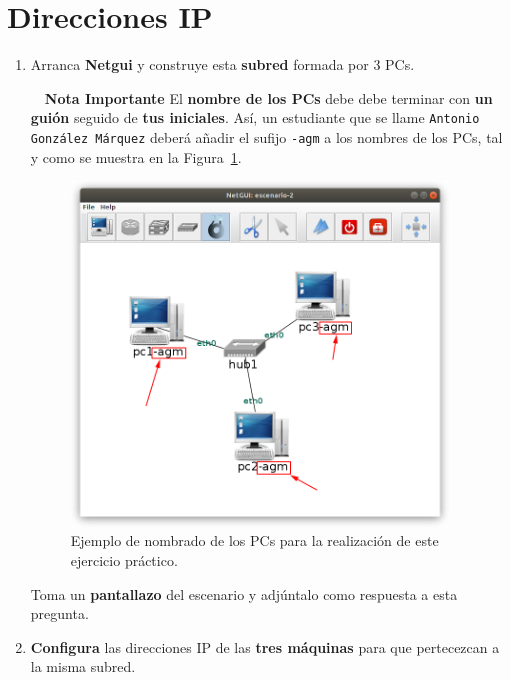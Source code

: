 \documentclass[a4paper]{article}
\begin{document}

\section{Direcciones IP}
\label{sec:ips}

\begin{enumerate}
	\item Arranca \textbf{Netgui} y construye esta \textbf{subred} formada por 3 PCs.
    \smallskip
    
    \begin{myredbox}{\faExclamationCircle~~\textbf{Nota Importante}}
    	El \textbf{nombre de los PCs} debe debe terminar con \textbf{un guión} 
    	seguido de \textbf{tus iniciales}.  
    	Así, un estudiante que se llame \texttt{Antonio González Márquez} deberá 
    	añadir el sufijo \texttt{-agm} a los nombres de los PCs, tal y como se muestra
    	en la Figura~\ref{fig:label-pcs}.
    \end{myredbox}
    \medskip
	
	\begin{figure}
		\begin{center}
			\includegraphics[width=10cm]{ip-01.png}
		\end{center}
		\caption{Ejemplo de nombrado de los PCs para la realización de este
		ejercicio práctico.}
	    \label{fig:label-pcs}
	\end{figure}

	Toma un \textbf{pantallazo} del escenario y adjúntalo como respuesta a esta pregunta.
	
	\item \textbf{Configura} las direcciones IP de las \textbf{tres máquinas} para que 
	pertecezcan a la  
	misma subred.
	\smallskip
	

\end{enumerate}
\end{document}
